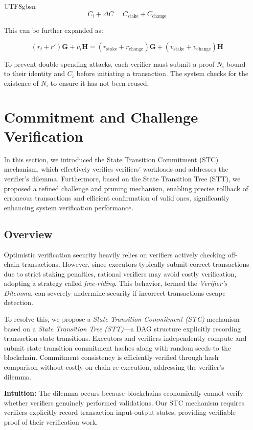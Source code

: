 \documentclass[runningheads]{llncs}
\begin{document}
\begin{CJK*}{UTF8}{gbsn}
\[
C_i + \Delta C = C_{\text{stake}} + C_{\text{change}}
\]

This can be further expanded as:

\[
(r_i + r')\mathbf{G} + v_i \mathbf{H} = (r_{\text{stake}} + r_{\text{change}}) \mathbf{G} + (v_{\text{stake}} + v_{\text{change}}) \mathbf{H}
\]

To prevent double-spending attacks, each verifier must submit a proof $N_i$ bound to their identity and $C_i$ before initiating a transaction. The system checks for the existence of $N_i$ to ensure it has not been reused.

\section{Commitment and Challenge Verification}

In this section, we introduced the State Transition Commitment (STC) mechanism, which effectively verifies verifiers' workloads and addresses the verifier's dilemma. Furthermore, based on the State Transition Tree (STT), we proposed a refined challenge and pruning mechanism, enabling precise rollback of erroneous transactions and efficient confirmation of valid ones, significantly enhancing system verification performance.

\subsection{Overview}
Optimistic verification security heavily relies on verifiers actively checking off-chain transactions. However, since executors typically submit correct transactions due to strict staking penalties, rational verifiers may avoid costly verification, adopting a strategy called \textit{free-riding}. This behavior, termed the \textit{Verifier's Dilemma}, can severely undermine security if incorrect transactions escape detection.

To resolve this, we propose a \textit{State Transition Commitment (STC)} mechanism based on a \textit{State Transition Tree (STT)}—a DAG structure explicitly recording transaction state transitions. Executors and verifiers independently compute and submit state transition commitment hashes along with random seeds to the blockchain. Commitment consistency is efficiently verified through hash comparison without costly on-chain re-execution, addressing the verifier's dilemma.

\textbf{Intuition:}
The dilemma occurs because blockchains economically cannot verify whether verifiers genuinely performed validations. Our STC mechanism requires verifiers explicitly record transaction input-output states, providing verifiable proof of their verification work.


\end{CJK*}
\end{document}
